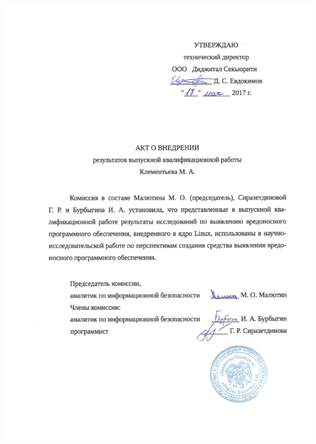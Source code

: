 \documentclass{gost7.32-2001}
\begin{document}
\begin{centering}
  \includegraphics[height=\textheight]{signed/akt.signed.png}
\end{centering}
\end{document}
